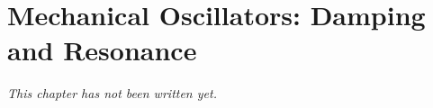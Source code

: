 \chapter{Mechanical Oscillators: Damping and Resonance}\label{ch:b1:oscillators-resonance}


\emph{This chapter has not been written yet.}
